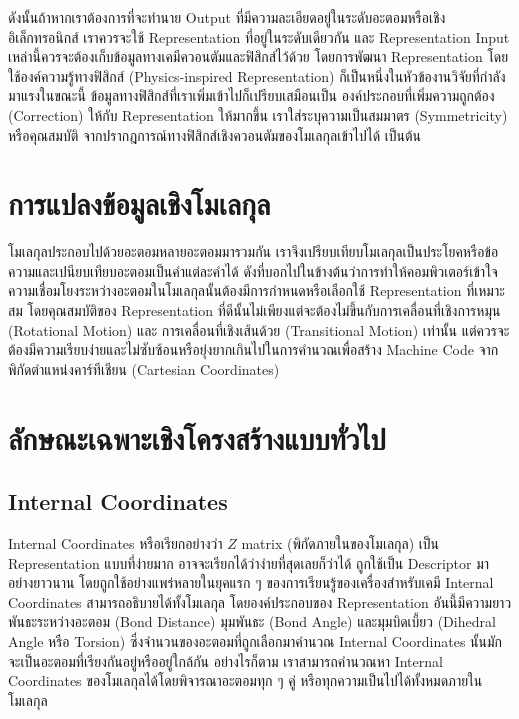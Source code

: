 ดังนั้นถ้าหากเราต้องการที่จะทำนาย Output ที่มีความละเอียดอยู่ในระดับอะตอมหรือเชิงอิเล็กทรอนิกส์ เราควรจะใช้ Representation ที่อยู่ในระดับเดียวกัน 
และ Representation Input เหล่านี้ควรจะต้องเก็บข้อมูลทางเคมีควอนตัมและฟิสิกส์ไว้ด้วย โดยการพัฒนา Representation โดยใช้องค์ความรู้ทางฟิสิกส์
(Physics-inspired Representation) ก็เป็นหนึ่งในหัวข้องานวิจัยที่กำลังมาแรงในขณะนี้ ข้อมูลทางฟิสิกส์ที่เราเพิ่มเข้าไปก็เปรียบเสมือนเป็น%
องค์ประกอบที่เพิ่มความถูกต้อง (Correction) ให้กับ Representation ให้มากขึ้น เราใส่ระบุความเป็นสมมาตร (Symmetricity) หรือคุณสมบัติ%
จากปรากฎการณ์ทางฟิสิกส์เชิงควอนตัมของโมเลกุลเข้าไปได้ เป็นต้น 

\section{การแปลงข้อมูลเชิงโมเลกุล}

โมเลกุลประกอบไปด้วยอะตอมหลายอะตอมมารวมกัน เราจึงเปรียบเทียบโมเลกุลเป็นประโยคหรือข้อความและเปนียบเทียบอะตอมเป็นคำแต่ละคำได้
ดังที่บอกไปในข้างต้นว่าการทำให้คอมพิวเตอร์เข้าใจความเชื่อมโยงระหว่างอะตอมในโมเลกุลนั้นต้องมีการกำหนดหรือเลือกใช้ Representation ที่เหมาะสม
โดยคุณสมบัติของ Representation ที่ดีนั้นไม่เพียงแต่จะต้องไม่ขึ้นกับการเคลื่อนที่เชิงการหมุน (Rotational Motion) และ การเคลื่อนที่เชิงเส้นด้วย 
(Transitional Motion) เท่านั้น แต่ควรจะต้องมีความเรียบง่ายและไม่ซับซ้อนหรือยุ่งยากเกินไปในการคำนวณเพื่อสร้าง Machine Code 
จากพิกัดตำแหน่งคาร์ทีเชียน (Cartesian Coordinates)

\section{ลักษณะเฉพาะเชิงโครงสร้างแบบทั่วไป}

\subsection{Internal Coordinates}

Internal Coordinates หรือเรียกอย่างว่า $Z$ matrix (พิกัดภายในของโมเลกุล) เป็น Representation แบบที่ง่ายมาก 
อาจจะเรียกได้ว่าง่ายที่สุดเลยก็ว่าได้ ถูกใช้เป็น Descriptor มาอย่างยาวนาน โดยถูกใช้อย่างแพร่หลายในยุคแรก ๆ ของการเรียนรู้ของเครื่องสำหรับเคมี
Internal Coordinates สามารถอธิบายได้ทั้งโมเลกุล โดยองค์ประกอบของ Representation อันนี้มีความยาวพันธะระหว่างอะตอม (Bond Distance) 
มุมพันธะ (Bond Angle) และมุมบิดเบี้ยว (Dihedral Angle หรือ Torsion) ซึ่งจำนวนของอะตอมที่ถูกเลือกมาคำนวณ Internal Coordinates 
นั้นมักจะเป็นอะตอมที่เรียงกันอยู่หรืออยู่ใกล้กัน อย่างไรก็ตาม เราสามารถคำนวณหา Internal Coordinates ของโมเลกุลได้โดยพิจารณาอะตอมทุก ๆ คู่
หรือทุกความเป็นไปได้ทั้งหมดภายในโมเลกุล

